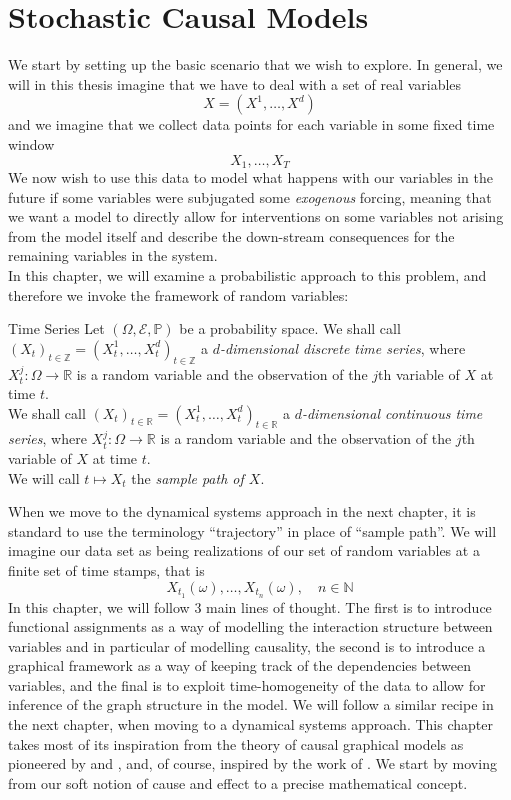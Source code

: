 \documentclass[11pt, a4paper]{memoir}
\theoremstyle{break}
\theoremstyle{break}
\theoremstyle{nonumberplain}
\newcommand{\mN}{\mathbb{N}}
\newcommand{\mZ}{\mathbb{Z}}
\newcommand{\mR}{\mathbb{R}}
\newcommand{\mP}{\mathbb{P}}
\begin{document}
\chapter{Stochastic Causal Models}
We start by setting up the basic scenario that we wish to explore. In general, we will in this thesis imagine that we have to deal with a set of real variables
$$X=(X^1,\ldots, X^d)$$
and we imagine that we collect data points for each variable in some fixed time window 
$$X_1,\ldots, X_T$$
We now wish to use this data to model what happens with our variables in the future if some variables were subjugated some \emph{exogenous} forcing, meaning that we want a model to directly allow for interventions on some variables not arising from the model itself and describe the down-stream consequences for the remaining variables in the system.\\[5pt]
In this chapter, we will examine a probabilistic approach to this problem, and therefore we invoke the framework of random variables:
\begin{mydefinition}{Time Series}
Let $(\Omega,\mathcal{E},\mP)$ be a probability space. We shall call $(X_t)_{t\in \mZ}=(X_t^{1},\ldots,X_{t}^d)_{t\in \mZ}$ a \emph{$d$-dimensional discrete time series}, where $X_t^j:\Omega\to \mR$ is a random variable and the observation of the $j$th variable of $X$ at time $t$.\\[5pt]
We shall call $(X_t)_{t\in \mR}=(X_t^{1},\ldots,X_{t}^d)_{t\in \mR}$ a \emph{$d$-dimensional continuous time series}, where $X_t^j:\Omega\to \mR$ is a random variable and the observation of the $j$th variable of $X$ at time $t$.\\[5pt]
We will call $t\mapsto X_t$ the \emph{sample path of $X$}.
\end{mydefinition}
When we move to the dynamical systems approach in the next chapter, it is standard to use the terminology \enquote{trajectory} in place of \enquote{sample path}. We will imagine our data set as being realizations of our set of random variables at a finite set of time stamps, that is
$$X_{t_1}(\omega),\ldots,X_{t_n}(\omega),\quad n\in \mN$$
In this chapter, we will follow 3 main lines of thought. The first is to introduce functional assignments as a way of modelling the interaction structure between variables and in particular of modelling causality, the second is to introduce a graphical framework as a way of keeping track of the dependencies between variables, and the final is to exploit time-homogeneity of the data to allow for inference of the graph structure in the model. We will follow a similar recipe in the next chapter, when moving to a dynamical systems approach. This chapter takes most of its inspiration from the theory of causal graphical models as pioneered by \cite{Spirtes} and \cite{Pearl}, and, of course, inspired by the work of \cite{Steffen}. We start by moving from our soft notion of cause and effect to a precise mathematical concept.
\end{document}
